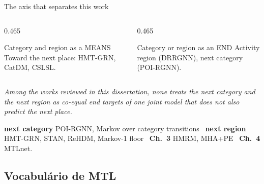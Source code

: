 \documentclass{beamer}
\begin{document}
\begin{frame}{The axis that separates this work}
    \begin{columns}[t,onlytextwidth]
        \begin{column}{0.465\textwidth}
            \begin{block}{Category and region as a MEANS}
                \small
                Toward the next place: HMT-GRN, CatDM, CSLSL.
            \end{block}
        \end{column}
        \hfill
        \begin{column}{0.465\textwidth}
            \begin{exampleblock}{Category or region as an END}
                \small
                Activity region (DRRGNN), next category (POI-RGNN).
            \end{exampleblock}
        \end{column}
    \end{columns}

    \bigskip
    {\small\itshape
    Among the works reviewed in this dissertation, none treats the next category and the
    next region as co-equal end targets of one joint model that does not also predict the
    next place.\par}

    \bigskip
    {\footnotesize
    \textbf{next category} POI-RGNN, Markov over category transitions \textbar\
    \textbf{next region} HMT-GRN, STAN, ReHDM, Markov-1 floor \textbar\
    \textbf{Ch.~3} HMRM, MHA+PE \textbar\ \textbf{Ch.~4} MTLnet.\par}
\end{frame}

\subsection{Vocabulário de MTL}
\end{document}
